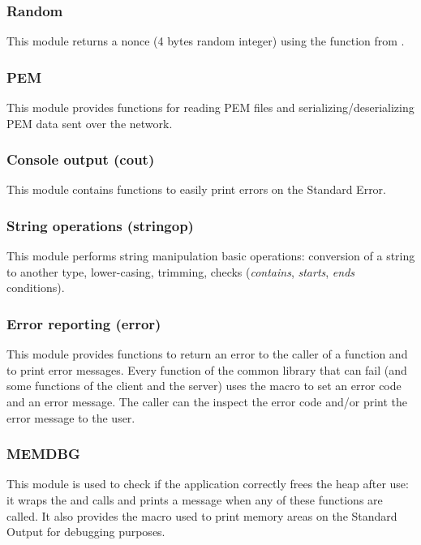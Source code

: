 \subsubsection{Random}

This module returns a nonce (4 bytes random integer) using the
 function from \openssl.

\subsubsection{PEM}

This module provides functions for reading PEM files and
serializing/deserializing PEM data sent over the network.

\subsubsection{Console output (cout)}

This module contains functions to easily print errors on the Standard Error.

\subsubsection{String operations (stringop)}

This module performs string manipulation basic operations: conversion of a
string to another type, lower-casing, trimming, checks (\emph{contains},
\emph{starts}, \emph{ends} conditions).

\subsubsection{Error reporting (error)}

This module provides functions to return an error to the caller of a function
and to print error messages. Every function of the common library that can fail
(and some functions of the client and the server) uses the 
macro to set an error code and an error message. The caller can the inspect the
error code and/or print the error message to the user.

\subsubsection{MEMDBG}

This module is used to check if the application correctly frees the heap after
use: it wraps the  and  calls and prints a message when
any of these functions are called. It also provides the 
macro used to print memory areas on the Standard Output for debugging purposes.

